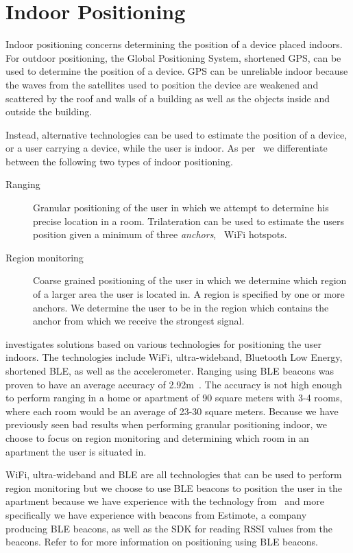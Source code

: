 \section{Indoor Positioning}
\label{sec:analysis:indoor-positioning}

Indoor positioning concerns determining the position of a device placed indoors. For outdoor positioning, the Global Positioning System, shortened GPS, can be used to determine the position of a device. GPS can be unreliable indoor because the waves from the satellites used to position the device are weakened and scattered by the roof and walls of a building as well as the objects inside and outside the building.

Instead, alternative technologies can be used to estimate the position of a device, or a user carrying a device, while the user is indoor. As per~\cite{prespecialisation} we differentiate between the following two types of indoor positioning.

\begin{description}
\item[Ranging] Granular positioning of the user in which we attempt to determine his precise location in a room. Trilateration can be used to estimate the users position given a minimum of three \emph{anchors}, \eg~WiFi hotspots.
\item[Region monitoring] Coarse grained positioning of the user in which we determine which region of a larger area the user is located in. A region is specified by one or more anchors. We determine the user to be in the region which contains the anchor from which we receive the strongest signal.
\end{description}

\cite{prespecialisation} investigates solutions based on various technologies for positioning the user indoors. The technologies include WiFi, ultra-wideband, Bluetooth Low Energy, shortened BLE, as well as the accelerometer. Ranging using BLE beacons was proven to have an average accuracy of 2.92m~\cite[p. 63]{prespecialisation}. The accuracy is not high enough to perform ranging in a home or apartment of 90 square meters with 3-4 rooms, where each room would be an average of 23-30 square meters. Because we have previously seen bad results when performing granular positioning indoor, we choose to focus on region monitoring and determining which room in an apartment the user is situated in.

WiFi, ultra-wideband and BLE are all technologies that can be used to perform region monitoring but we choose to use BLE beacons to position the user in the apartment because we have experience with the technology from~\cite{prespecialisation} and more specifically we have experience with beacons from Estimote, a company producing BLE beacons, as well as the SDK for reading RSSI values from the beacons. Refer to  for more information on positioning using BLE beacons.

